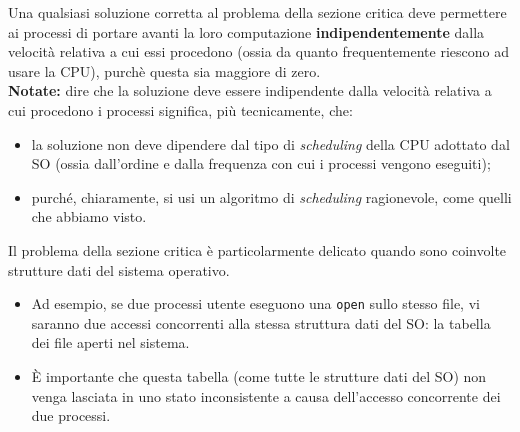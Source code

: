 Una qualsiasi soluzione corretta al problema della sezione critica deve permettere ai processi di portare avanti la loro computazione \textbf{indipendentemente} dalla velocità relativa a cui essi procedono (ossia da quanto frequentemente riescono ad usare la CPU), purchè questa sia maggiore di zero.\\
\textbf{Notate:} dire che la soluzione deve essere indipendente dalla velocità relativa a cui procedono i processi significa, più tecnicamente, che:
\begin{itemize}
    \item la soluzione non deve dipendere dal tipo di \textit{scheduling} della CPU adottato dal SO (ossia dall'ordine e dalla frequenza con cui i processi vengono eseguiti);
    \item purché, chiaramente, si usi un algoritmo di \textit{scheduling} ragionevole, come quelli che abbiamo visto.
\end{itemize}
Il problema della sezione critica è particolarmente delicato quando sono coinvolte strutture dati del sistema operativo.
\begin{itemize}
    \item Ad esempio, se due processi utente eseguono una \texttt{open} sullo stesso file, vi saranno due accessi concorrenti alla stessa struttura dati del SO: la tabella dei file aperti nel sistema.
    \item È importante che questa tabella (come tutte le strutture dati del SO) non venga lasciata in uno stato inconsistente a causa dell'accesso concorrente dei due processi.
\end{itemize}

